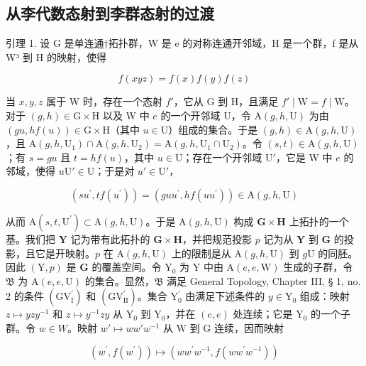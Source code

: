 \subsection{从李代数态射到李群态射的过渡}

引理 1. 设 G 是单连通†拓扑群，W 是 e 的对称连通开邻域，H 是一个群，f 是从 W³ 到 H 的映射，使得

\[
f (x y z) = f (x) f (y) f (z)
\]

当 \(x, y, z\) 属于 W 时，存在一个态射 \(f'\)，它从 G 到 H，且满足 \(f' \mid \mathrm{W} = f \mid \mathrm{W}\)。对于 \((g, h) \in \mathrm{G} \times \mathrm{H}\) 以及 W 中 \(e\) 的一个开邻域 U，令 \(\mathrm{A}(g, h, \mathrm{U})\) 为由 \((gu, hf(u)) \in \mathrm{G} \times \mathrm{H}\)（其中 \(u \in \mathrm{U}\)）组成的集合。于是 \((g, h) \in \mathrm{A}(g, h, \mathrm{U})\)，且 \(\mathrm{A}(g, h, \mathrm{U}_1) \cap \mathrm{A}(g, h, \mathrm{U}_2) = \mathrm{A}(g, h, \mathrm{U}_1 \cap \mathrm{U}_2)\)。令 \((s, t) \in \mathrm{A}(g, h, \mathrm{U})\)；有 \(s = gu\) 且 \(t = hf(u)\)，其中 \(u \in \mathrm{U}\)；存在一个开邻域 \(\mathrm{U}'\)，它是 W 中 \(e\) 的邻域，使得 \(u\mathrm{U}' \in \mathrm{U}\)；于是对 \(u' \in \mathrm{U}'\)，

\[
(s u ^ {\prime}, t f (u ^ {\prime})) = (g u u ^ {\prime}, h f (u u ^ {\prime})) \in \mathrm{A} (g, h, \mathrm{U})
\]

从而 \(\mathrm{A}(s,t,\mathrm{U}^{\prime})\subset \mathrm{A}(g,h,\mathrm{U})\)。于是 \(\mathrm{A}(g,h,\mathrm{U})\) 构成 \(\mathbf{G}\times \mathbf{H}\) 上拓扑的一个基。我们把 \(\mathbf{Y}\) 记为带有此拓扑的 \(\mathbf{G}\times \mathbf{H}\)，并把规范投影 \(p\) 记为从 \(\mathbf{Y}\) 到 \(\mathbf{G}\) 的投影，且它是开映射。\(p\) 在 \(\mathrm{A}(g,h,\mathrm{U})\) 上的限制是从 \(\mathrm{A}(g,h,\mathrm{U})\) 到 \(g\mathrm{U}\) 的同胚。因此 \((\mathrm{Y},p)\) 是 \(\mathbf{G}\) 的覆盖空间。令 \(\mathrm{Y}_0\) 为 \(\mathrm{Y}\) 中由 \(\mathrm{A}(e,e,\mathrm{W})\) 生成的子群，令 \(\mathfrak{B}\) 为 \(\mathrm{A}(e,e,\mathrm{U})\) 的集合。显然，\(\mathfrak{B}\) 满足 General Topology, Chapter III, § 1, no. 2 的条件 \((\mathrm{GV}_{\mathrm{I}}^{\prime})\) 和 \((\mathrm{GV}_{\mathrm{II}}^{\prime})\)。集合 \(\mathrm{Y}_0^{\prime}\) 由满足下述条件的 \(y\in \mathrm{Y}_0\) 组成：映射 \(z\mapsto yzy^{-1}\) 和 \(z\mapsto y^{-1}zy\) 从 \(\mathrm{Y}_0\) 到 \(\mathrm{Y}_0\)，并在 \((e,e)\) 处连续；它是 \(\mathrm{Y}_0\) 的一个子群。令 \(w\in W\)。映射 \(w'\mapsto ww'w^{-1}\) 从 \(\mathrm{W}\) 到 \(\mathrm{G}\) 连续，因而映射

\[
\left(w ^ {\prime}, f \left(w ^ {\prime}\right)\right) \mapsto \left(w w ^ {\prime} w ^ {- 1}, f \left(w w ^ {\prime} w ^ {- 1}\right)\right)
\]

